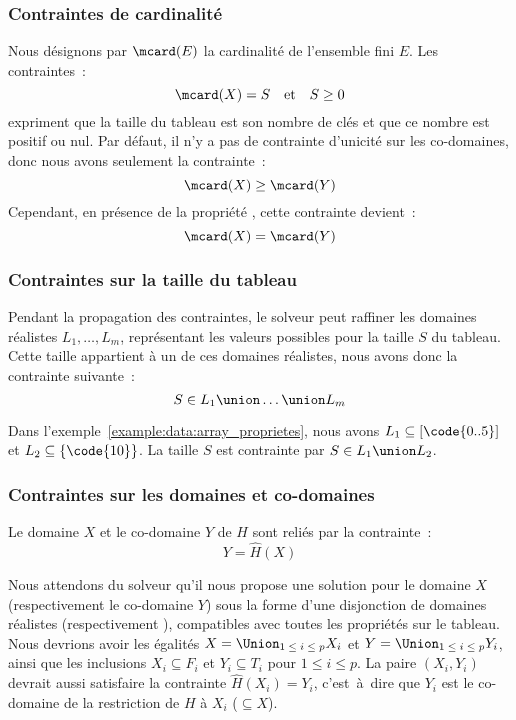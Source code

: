 \subsubsection{Contraintes de cardinalité}

Nous désignons par $\mcard(E)$ la cardinalité de l'ensemble fini $E$. Les
con\-train\-tes~:
%
$$\mcard(X) = S \quad\mathrm{et}\quad S \geq 0$$
%
expriment que la taille du tableau est son nombre de clés et que ce nombre est
positif ou nul. Par défaut, il n'y a pas de contrainte d'unicité sur les
co-domaines, donc nous avons seulement la contrainte~:
%
$$\mcard(X) \geq \mcard(Y)$$
%
Cependant, en présence de la propriété , cette contrainte
devient~:
%
$$\mcard(X) = \mcard(Y)$$

\subsubsection{Contraintes sur la taille du tableau}

Pendant la propagation des contraintes, le solveur peut raffiner les domaines
réalistes $L_1, \dots, L_m$, représentant les valeurs possibles pour la taille
$S$ du tableau. Cette taille appartient à un de ces domaines réalistes, nous
avons donc la contrainte suivante~:
%
$$S \in L_1 \union \dots \union L_m$$

Dans l'exemple~\ref{example:data:array_proprietes}, nous avons $L_1 \subseteq
[\code{0..5}]$ et $L_2 \subseteq \{\code{10}\}$. La taille $S$ est contrainte
par $S \in L_1 \union L_2$.

\subsubsection{Contraintes sur les domaines et co-domaines}

Le domaine $X$ et le co-domaine $Y$ de $H$ sont reliés par la contrainte~:
%
$$Y = \hat{H}(X)$$

Nous attendons du solveur qu'il nous propose une solution pour le domaine $X$
(respectivement le co-domaine $Y$) sous la forme d'une disjonction de domaines
réalistes  (respectivement ), compatibles avec toutes les propriétés sur le tableau. Nous
devrions avoir les égalités $X = \Union_{1 \;\leq\; i \;\leq\; p} X_i$ et $Y =
\Union_{1 \;\leq\; i \;\leq\; p} Y_i$, ainsi que les inclusions $X_i \subseteq
F_i$ et $Y_i \subseteq T_i$ pour $1 \leq i \leq p$. La paire $(X_i, Y_i)$
devrait aussi satisfaire la contrainte $\hat{H}(X_i) = Y_i$, c'est~à~dire que
$Y_i$ est le co-domaine de la restriction de $H$ à $X_i$ ($\subseteq X$).

